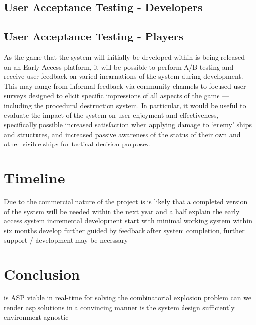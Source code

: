 \documentclass[11pt]{report}
\begin{document}
	\section{User Acceptance Testing - Developers}

	\section{User Acceptance Testing - Players}
		As the game that the system will initially be developed within is being released on an Early Access platform, it will be possible to perform A/B testing and receive user feedback on varied incarnations of the system during development. This may range from informal feedback via community channels to focused user surveys designed to elicit specific impressions of all aspects of the game --- including the procedural destruction system. In particular, it would be useful to evaluate the impact of the system on user enjoyment and effectiveness, specifically possible increased satisfaction when applying damage to `enemy' ships and structures, and increased passive awareness of the status of their own and other visible ships for tactical decision purposes.

\chapter{Timeline}
	Due to the commercial nature of the project is is likely that a completed version of the system will be needed within the next year and a half
	explain the early access system
	incremental development
	start with minimal working system within six months
	develop further guided by feedback
	after system completion, further support / development may be necessary

\chapter{Conclusion}
	is ASP viable in real-time for solving the combinatorial explosion problem
	can we render asp solutions in a convincing manner
	is the system design sufficiently environment-agnostic





\end{document}
